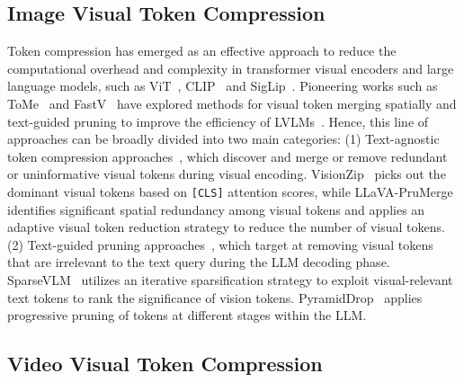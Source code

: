 \subsection{Image Visual Token Compression}

Token compression has emerged as an effective approach to reduce the computational overhead and complexity in transformer visual encoders and large language models, such as ViT~\cite{dosovitskiy2020image}, CLIP~\cite{radford2021learning} and SigLip~\cite{zhai2023sigmoid}. Pioneering works such as ToMe~\cite{bolya2022token} and FastV~\cite{chen2024image} have explored methods for visual token merging spatially and text-guided pruning to improve the efficiency of LVLMs~\cite{kong2025token}. Hence, this line of approaches can be broadly divided into two main categories: (1) Text-agnostic token compression approaches~\cite{yang2025topv,arif2025hired,shang2025llava,wen2025stop,yang2025visionzip,zhang2024cls,zhang2025vscan}, which discover and merge or remove redundant or uninformative visual tokens during visual encoding. VisionZip~\cite{yang2025visionzip} picks out the dominant visual tokens based on \texttt{[CLS]} attention scores, while LLaVA-PruMerge~\cite{shang2025llava} identifies significant spatial redundancy among visual tokens and applies an adaptive visual token reduction strategy to reduce the number of visual tokens. (2) Text-guided pruning approaches~\cite{tan2025tokencarve,zhang2024sparsevlm,xing2025conical,xing2024pyramiddrop,liu2024multi,ye2025atp,khaki2025sparsevila}, which target at removing visual tokens that are irrelevant to the text query during the LLM decoding phase. SparseVLM~\cite{zhang2024sparsevlm} utilizes an iterative sparsification strategy to exploit visual-relevant text tokens to rank the significance of vision tokens. PyramidDrop~\cite{xing2024pyramiddrop} applies progressive pruning of tokens at different stages within the LLM.


\subsection{Video Visual Token Compression}

